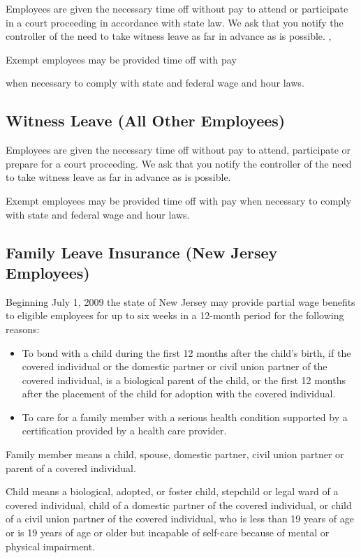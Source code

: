Employees are given the necessary time off without pay to attend or participate in a court proceeding in accordance with state law. We ask that you notify the controller of the need to take witness leave as far in advance as is possible. ,

Exempt employees may be provided time off with pay

when necessary to comply with state and federal wage and hour laws.

\subsection{Witness Leave (All Other Employees)}

Employees are given the necessary time off without pay to attend, participate or prepare for a court proceeding. We ask that you notify the controller of the need to take witness leave as far in advance as is possible.

Exempt employees may be provided time off with pay when necessary to comply with state and federal wage and hour laws.

\subsection{Family Leave Insurance (New Jersey Employees)}

Beginning July 1, 2009 the state of New Jersey may provide partial wage benefits to eligible employees for up to six weeks in a 12-month period for the following reasons:

\begin{itemize} 	\item To bond with a child during the first 12 months 	after the child's birth, if the covered individual or 	the domestic partner or civil union partner of the 	covered individual, is a biological parent of the 	child, or the first 12 months after the placement 	of the child for adoption with the covered 	individual.
	
	\item To care for a family member with a serious 	health condition supported by a certification 	provided by a health care provider. \end{itemize}

Family member means a child, spouse, domestic partner, civil union partner or parent of a covered individual.

Child means a biological, adopted, or foster child, stepchild or legal ward of a covered individual, child of a domestic partner of the covered individual, or child of a civil union partner of the covered individual, who is less than 19 years of age or is 19 years of age or older but incapable of self-care because of mental or physical impairment.

